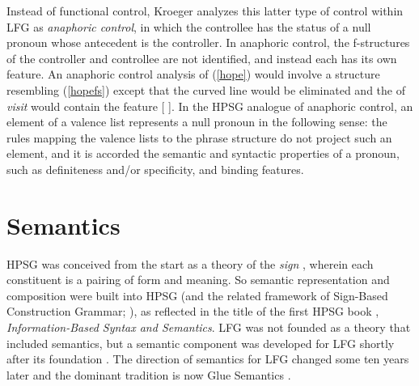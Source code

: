 Instead of functional control, Kroeger analyzes this latter type of control with\-in LFG as \textit{anaphoric control}, in which the controllee has the status of a null pronoun whose antecedent is the controller.  In anaphoric control, the f-structures of the controller and controllee are not identified, and instead each has its own  feature.  An anaphoric control analysis of (\ref{hope}) would involve a structure resembling (\ref{hopefs}) except that the curved line would be eliminated and the  of \textit{visit} would contain the feature [ ].  In the HPSG analogue of anaphoric control, an element of a valence list represents a null pronoun in the following sense:  the rules mapping the valence lists to the phrase structure do not project such an element, and it is accorded the semantic and syntactic properties of a pronoun, such as definiteness and/or specificity, and binding features.  

\section{Semantics}


HPSG  was conceived from the
start as  a theory of the \textit{sign} \citep{Saussure16a-Fr}, 
wherein each constituent is a pairing of form and meaning.  
So semantic representation and composition  were built into HPSG (and the 
related framework of Sign-Based Construction Grammar;
 \citealt{BS2012a-ed}), as reflected in the title of the first HPSG
book \citep{pollard;sag87}, \textit{Information-Based Syntax and
  Semantics}.  LFG was not founded as a theory that included semantics, but a semantic component was developed for LFG shortly after its foundation \citep{halvorsen83}.  The direction of semantics for LFG changed some ten years later and the dominant tradition is now Glue Semantics \citep{dalrymple;ea93,dalrymple99,Dalrymple2001a-u,asudeh-lpr,dalrymple;ea19}.  


